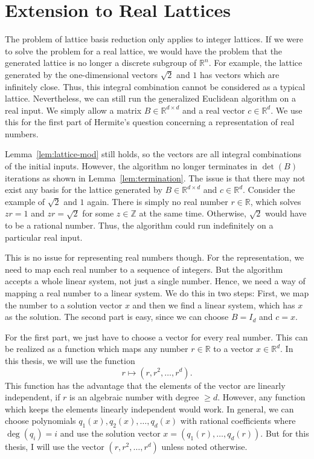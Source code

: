 \section{Extension to Real Lattices}

The problem of lattice basis reduction only applies to integer lattices.
If we were to solve the problem for a real lattice,
we would have the problem that the generated lattice is no longer a discrete subgroup of $ℝ^n$.
For example, the lattice generated by the one-dimensional vectors $\sqrt{2}$ and $1$
has vectors which are infinitely close.
Thus, this integral combination cannot be considered as a typical lattice.
Nevertheless,
we can still run the generalized Euclidean algorithm on a real input.
We simply allow a matrix $B ∈ ℝ^{d×d}$ and a real vector $c ∈ ℝ^d$.
We use this for the first part of Hermite's question concerning a
representation of real numbers.

Lemma~\ref{lem:lattice-mod} still holds,
so the vectors are all integral combinations of the initial inputs.
However, the algorithm no longer terminates in $\det(B)$ iterations
as shown in Lemma~\ref{lem:termination}.
The issue is that there may not exist any basis for the lattice generated by $B
∈ ℝ^{d×d}$ and $c ∈ ℝ^d$.
Consider the example of $\sqrt{2}$ and $1$ again.
There is simply no real number $r ∈ ℝ$, which solves $zr = 1$ and $zr =
\sqrt{2}$ for some $z ∈ ℤ$ at the same time.
Otherwise, $\sqrt{2}$ would have to be a rational number.
Thus, the algorithm could run indefinitely on a particular real input.

This is no issue for representing real numbers though.
For the representation,
we need to map each real number to a sequence of integers.
But the algorithm accepts a whole linear system,
not just a single number.
Hence, we need a way of mapping a real number to a linear system.
We do this in two steps:
First, we map the number to a solution vector $x$
and then we find a linear system,
which has $x$ as the solution.
The second part is easy,
since we can choose $B = I_d$ and $c = x$.

For the first part, we just have to choose a vector for every real number.
This can be realized as a function which maps any number $r ∈ ℝ$ to a vector $x ∈ ℝ^d$.
In this thesis, we will use the function
\[
  r ↦ (r, r^2, …, r^d).
\]
This function has the advantage that the elements of the vector are linearly independent,
if $r$ is an algebraic number with degree $≥ d$.
However, any function which keeps the elements linearly independent would work.
In general, we can choose polynomials $q_1(x), q_2(x), …, q_d(x)$ with rational
coefficients where $\deg(q_i) = i$ and
use the solution vector $x = (q_1(r), …, q_d(r))$.
But for this thesis, I will use the vector $(r, r^2, …, r^d)$ unless noted otherwise.

